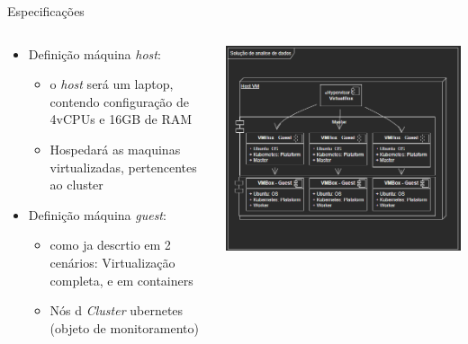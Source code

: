 \documentclass[10pt,brazil]{beamer}
\theoremstyle{definition}
\begin{document}
\begin{frame}[allowframebreaks]{Especificações}
  \framebreak
  
  \begin{columns}
    \begin{column}{0.5\textwidth}
    
      \begin{itemize}
        \item Definição máquina \emph{host}:
              \begin{itemize}
                \item o \emph{host} será um laptop, contendo configuração de 4vCPUs e 16GB de RAM
                \item Hospedará as maquinas virtualizadas, pertencentes ao cluster
                      
              \end{itemize}
        \item Definição máquina \emph{guest}:
              \begin{itemize}
                \item como ja descrtio em 2 cenários: Virtualização completa, e em containers
                \item Nós d \emph{Cluster} ubernetes (objeto de monitoramento)
              \end{itemize}
      \end{itemize}
    \end{column}
    \begin{column}{0.5\textwidth}
      \includegraphics[width=1\textwidth]{SCKET.png}
    \end{column}
  \end{columns}
\end{frame}
\end{document}

